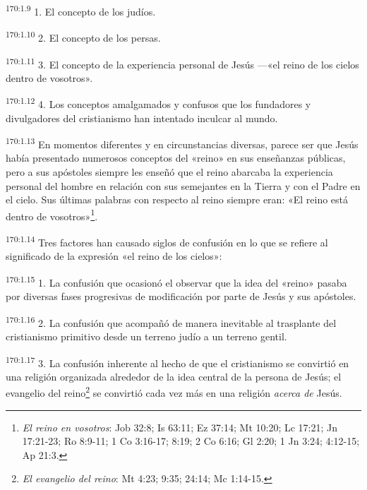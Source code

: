 \par
\textsuperscript{170:1.9} 1. El concepto de los judíos.

\par
\textsuperscript{170:1.10} 2. El concepto de los persas.

\par
\textsuperscript{170:1.11} 3. El concepto de la experiencia personal de Jesús ---«el reino de los cielos dentro de vosotros».

\par
\textsuperscript{170:1.12} 4. Los conceptos amalgamados y confusos que los fundadores y divulgadores del cristianismo han intentado inculcar al mundo.

\par
\textsuperscript{170:1.13} En momentos diferentes y en circunstancias diversas, parece ser que Jesús había presentado numerosos conceptos del «reino» en sus enseñanzas públicas, pero a sus apóstoles siempre les enseñó que el reino abarcaba la experiencia personal del hombre en relación con sus semejantes en la Tierra y con el Padre en el cielo. Sus últimas palabras con respecto al reino siempre eran: «El reino está dentro de vosotros»\footnote{\textit{El reino en vosotros}: Job 32:8; Is 63:11; Ez 37:14; Mt 10:20; Lc 17:21; Jn 17:21-23; Ro 8:9-11; 1 Co 3:16-17; 8:19; 2 Co 6:16; Gl 2:20; 1 Jn 3:24; 4:12-15; Ap 21:3.}.

\par
\textsuperscript{170:1.14} Tres factores han causado siglos de confusión en lo que se refiere al significado de la expresión «el reino de los cielos»:

\par
\textsuperscript{170:1.15} 1. La confusión que ocasionó el observar que la idea del «reino» pasaba por diversas fases progresivas de modificación por parte de Jesús y sus apóstoles.

\par
\textsuperscript{170:1.16} 2. La confusión que acompañó de manera inevitable al trasplante del cristianismo primitivo desde un terreno judío a un terreno gentil.

\par
\textsuperscript{170:1.17} 3. La confusión inherente al hecho de que el cristianismo se convirtió en una religión organizada alrededor de la idea central de la persona de Jesús; el evangelio del reino\footnote{\textit{El evangelio del reino}: Mt 4:23; 9:35; 24:14; Mc 1:14-15.} se convirtió cada vez más en una religión \textit{acerca de} Jesús.

